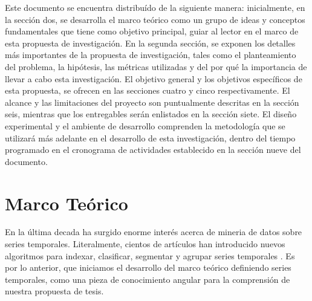 Este documento se encuentra distribu\'ido de la siguiente manera: inicialmente, en la secci\'on dos, se desarrolla el marco te\'orico como un grupo de ideas y conceptos fundamentales que tiene como objetivo principal, guiar al lector en el marco de esta propuesta de investigaci\'on. En la segunda secci\'on, se exponen los detalles m\'as importantes de la propuesta de investigaci\'on, tales como el planteamiento del problema, la hip\'otesis, las m\'etricas utilizadas y del por qu\'e la importancia de llevar a cabo esta investigaci\'on. El objetivo general y los objetivos espec\'ificos de esta propuesta, se ofrecen en las secciones cuatro y cinco respectivamente. El alcance y las limitaciones del proyecto son puntualmente descritas en la secci\'on seis, mientras que los entregables ser\'an enlistados en la secci\'on siete. El dise\~no experimental y el ambiente de desarrollo comprenden la metodolog\'ia que se utilizar\'a m\'as adelante en el desarrollo de esta investigaci\'on, dentro del tiempo programado en el cronograma de actividades establecido en la secci\'on nueve del documento.
\section{\textbf{Marco Te\'orico}}
En la \'ultima decada ha surgido enorme inter\'es acerca de mineria de datos sobre series temporales. Literalmente, cientos de art\'iculos han introducido nuevos algoritmos para indexar, clasificar, segmentar y agrupar series temporales \cite{sigmod}. Es por lo anterior, que iniciamos el desarrollo del marco te\'orico definiendo series temporales, como una pieza de conocimiento angular para la comprensi\'on de nuestra propuesta de tesis.
